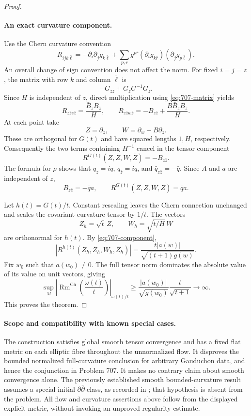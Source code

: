 \documentclass[11pt,a4paper]{article}
\theoremstyle{remark}
\begin{document}
\begin{proof}
\paragraph{An exact curvature component.}
Use the Chern curvature convention
\[
R_{i\bar j k\bar\ell}
=-\partial_i\partial_{\bar j}g_{k\bar\ell}
+\sum_{p,r}g^{p\bar r}
(\partial_i g_{k\bar r})(\partial_{\bar j}g_{p\bar\ell}).
\]
An overall change of sign convention does not affect the norm. For fixed $i=j=z$, the matrix with row $k$ and column $\bar\ell$ is
\[
-G_{z\bar z}+G_zG^{-1}G_{\bar z}.
\]
Since $H$ is independent of $z$, direct multiplication using \eqref{eq:707-matrix} yields
\[
R_{z\bar z z\bar z}=\frac{\bar B_z B_{\bar z}}H,
\qquad
R_{z\bar z w\bar z}
=-B_{z\bar z}+\frac{B\bar B_z B_{\bar z}}H.
\]
At each point take
\[
Z=\partial_z,
\qquad W=\partial_w-B\partial_z.
\]
These are orthogonal for $G(t)$ and have squared lengths $1,H$, respectively. Consequently the two terms containing $H^{-1}$ cancel in the tensor component
\[
R^{G(t)}(Z,\bar Z,W,\bar Z)=-B_{z\bar z}.
\]
The formula for $\rho$ shows that $q_z=iq$, $q_{\bar z}=iq$, and $\bar q_{z\bar z}=-\bar q$. Since $A$ and $a$ are independent of $z$,
\[
B_{z\bar z}=-\bar q a,
\qquad
R^{G(t)}(Z,\bar Z,W,\bar Z)=\bar q a.
\tag{707.3}\label{eq:707-component}
\]

Let $h(t)=G(t)/t$. Constant rescaling leaves the Chern connection unchanged and scales the covariant curvature tensor by $1/t$. The vectors
\[
Z_h=\sqrt t\,Z,
\qquad W_h=\sqrt{t/H}\,W
\]
are orthonormal for $h(t)$. By \eqref{eq:707-component},
\[
\left|R^{h(t)}(Z_h,\bar Z_h,W_h,\bar Z_h)\right|
=\frac{t|a(w)|}{\sqrt{(t+1)g(w)}}.
\]
Fix $w_0$ such that $a(w_0)\ne0$. The full tensor norm dominates the absolute value of its value on unit vectors, giving
\[
\sup_M\left|\operatorname{Rm}^{\mathrm{Ch}}\left(\frac{\omega(t)}t\right)\right|_{\omega(t)/t}
\ge
\frac{|a(w_0)|}{\sqrt{g(w_0)}}\frac{t}{\sqrt{t+1}}
\longrightarrow\infty.
\]
This proves the theorem.
\end{proof}

\paragraph{Scope and compatibility with known special cases.}
The construction satisfies global smooth tensor convergence and has a fixed flat metric on each elliptic fibre throughout the unnormalized flow. It disproves the bounded normalized full-curvature conclusion for arbitrary Gauduchon data, and hence the conjunction in Problem 707. It makes no contrary claim about smooth convergence alone. The previously established smooth bounded-curvature result assumes a special initial $\partial\bar\partial$-class, as recorded in \cite[Section 4.2]{TosattiWeinkove2022}; that hypothesis is absent from the problem. All flow and curvature assertions above follow from the displayed explicit metric, without invoking an unproved regularity estimate.
\end{document}
